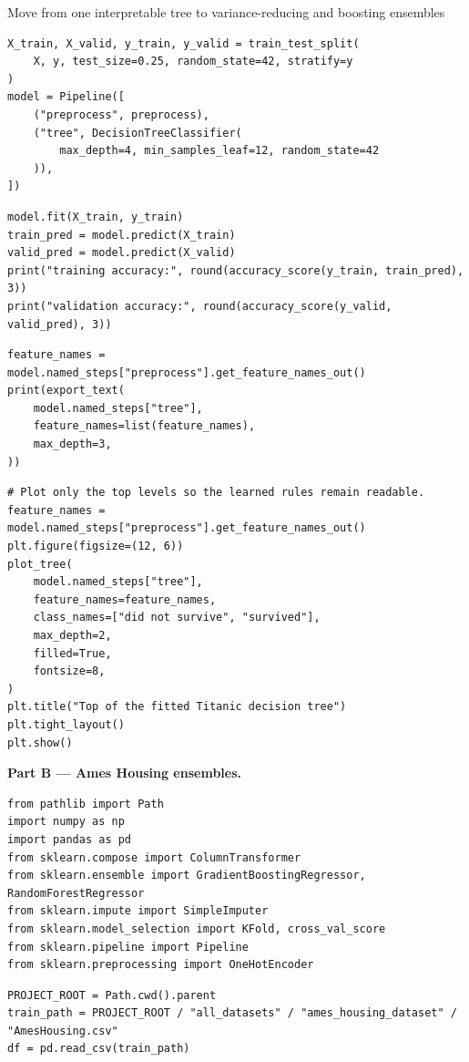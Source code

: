 \begin{labproject}{Move from one interpretable tree to variance-reducing and boosting ensembles}
\begin{lstlisting}[style=mlpython]
X_train, X_valid, y_train, y_valid = train_test_split(
    X, y, test_size=0.25, random_state=42, stratify=y
)
model = Pipeline([
    ("preprocess", preprocess),
    ("tree", DecisionTreeClassifier(
        max_depth=4, min_samples_leaf=12, random_state=42
    )),
])
\end{lstlisting}

\begin{lstlisting}[style=mlpython]
model.fit(X_train, y_train)
train_pred = model.predict(X_train)
valid_pred = model.predict(X_valid)
print("training accuracy:", round(accuracy_score(y_train, train_pred), 3))
print("validation accuracy:", round(accuracy_score(y_valid, valid_pred), 3))
\end{lstlisting}

\begin{lstlisting}[style=mlpython]
feature_names = model.named_steps["preprocess"].get_feature_names_out()
print(export_text(
    model.named_steps["tree"],
    feature_names=list(feature_names),
    max_depth=3,
))
\end{lstlisting}

\begin{lstlisting}[style=mlpython]
# Plot only the top levels so the learned rules remain readable.
feature_names = model.named_steps["preprocess"].get_feature_names_out()
plt.figure(figsize=(12, 6))
plot_tree(
    model.named_steps["tree"],
    feature_names=feature_names,
    class_names=["did not survive", "survived"],
    max_depth=2,
    filled=True,
    fontsize=8,
)
plt.title("Top of the fitted Titanic decision tree")
plt.tight_layout()
plt.show()
\end{lstlisting}

\medskip\noindent\textbf{Part B --- Ames Housing ensembles.}\par
\begin{lstlisting}[style=mlpython]
from pathlib import Path
import numpy as np
import pandas as pd
from sklearn.compose import ColumnTransformer
from sklearn.ensemble import GradientBoostingRegressor, RandomForestRegressor
from sklearn.impute import SimpleImputer
from sklearn.model_selection import KFold, cross_val_score
from sklearn.pipeline import Pipeline
from sklearn.preprocessing import OneHotEncoder
\end{lstlisting}

\begin{lstlisting}[style=mlpython]
PROJECT_ROOT = Path.cwd().parent
train_path = PROJECT_ROOT / "all_datasets" / "ames_housing_dataset" / "AmesHousing.csv"
df = pd.read_csv(train_path)
\end{lstlisting}


\end{labproject}
